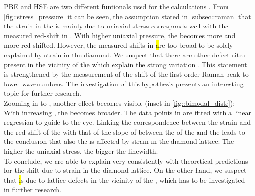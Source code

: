 	PBE and HSE are two different funtionals used for the calculations .
	From \autoref{fig::stress_pressure} it can be seen, the assumption stated in \autoref{subsec::raman} that the strain in the \nds is mainly due to uniaxial stress corresponds well with the measured \ZPL red-shift in \vl.
	With higher uniaxial pressure, the \ZPL becomes more and more red-shifted.
	However, the measured shifts in \hl are too broad to be solely explained by strain in the diamond.
	We suspect that there are other defect sites present in the vicinity of the \siv which explain the strong variation \cite{Thiering2015}.
	This statement is strengthened by the measurement of the shift of the first order Raman peak to lower wavenumbers.
	The investigation of this hypothesis presents an interesting topic for further research.
	\\
	Zooming in to \vl, another effect becomes visible (inset in \autoref{fig::bimodal_distr}):
	With increasing  \ZPL, the \lw becomes broader.
	The data points in \vl are fitted with a linear regression to guide to the eye.
	Linking the correspondence between the strain and the red-shift of the \ZPL with that of the slope of between the \cwl of the \ZPL and the \lw leads to the conclusion that also the \lw is affected by strain in the diamond lattice: The higher the uniaxial stress, the bigger the linewidth.
	\\
	To conclude, we are able to explain \vl very consistently with theoretical predictions for the \ZPL \cwl shift due to strain in the diamond lattice. 
	On the other hand, we suspect that \hl is due to lattice defects in the vicinity of the \siv, which has to be investigated in further research.
